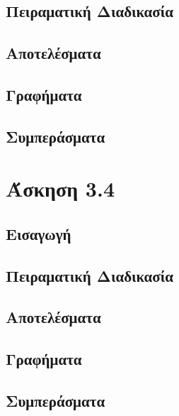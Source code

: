 \documentclass{article}
\begin{document}
\subsection*{Πειραματική Διαδικασία}
\subsection*{Αποτελέσματα}
\subsection*{Γραφήματα}
\subsection*{Συμπεράσματα}
\section*{Άσκηση 3.4}
\subsection*{Εισαγωγή}
\subsection*{Πειραματική Διαδικασία}
\subsection*{Αποτελέσματα}
\subsection*{Γραφήματα}
\subsection*{Συμπεράσματα}
\end{document}
